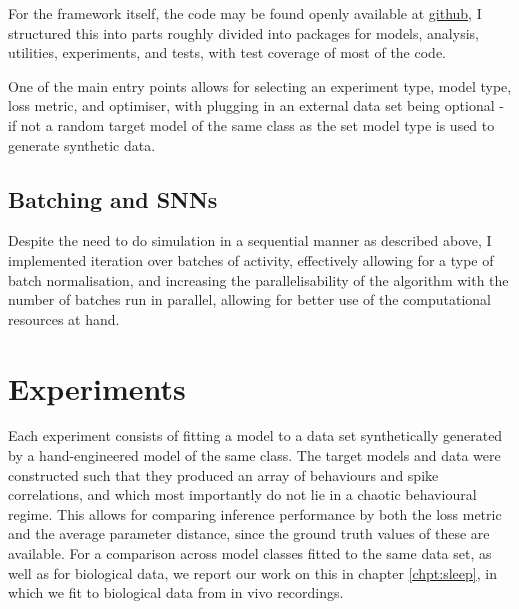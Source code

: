 \documentclass[mphil,deptreport,ianc]{infthesis} %
\begin{document}
For the framework itself, the code may be found openly available at \href{https://github.com/williampeer/snn_inference}{github}, I structured this into parts roughly divided into packages for models, analysis, utilities, experiments, and tests, with test coverage of most of the code.

One of the main entry points allows for selecting an experiment type, model type, loss metric, and optimiser, with plugging in an external data set being optional - if not a random target model of the same class as the set model type is used to generate synthetic data.


\subsection{Batching and SNNs}

Despite the need to do simulation in a sequential manner as described above, I implemented iteration over batches of activity, effectively allowing for a type of batch normalisation, and increasing the parallelisability of the algorithm with the number of batches run in parallel, allowing for better use of the computational resources at hand.


\section{Experiments}

Each experiment consists of fitting a model to a data set synthetically generated by a hand-engineered model of the same class.
The target models and data were constructed such that they produced an array of behaviours and spike correlations, and which most importantly do not lie in a chaotic behavioural regime.
This allows for comparing inference performance by both the loss metric and the average parameter distance, since the ground truth values of these are available.
For a comparison across model classes fitted to the same data set, as well as for biological data, we report our work on this in chapter \ref{chpt:sleep}, in which we fit to biological data from in vivo recordings.

\end{document}
